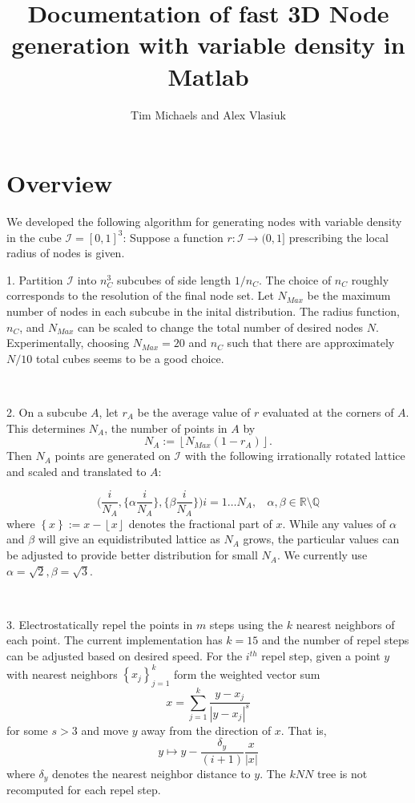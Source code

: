 \documentclass[]{article}
\title{Documentation of fast 3D Node generation with variable density in Matlab}
\author{Tim Michaels and Alex Vlasiuk}
\date{}
\begin{document}
\maketitle

\section{Overview}
We developed the following algorithm for generating nodes with variable density in the cube $\mathcal{I} = [0,1]^3$: Suppose a function $r: \mathcal{I} \to (0,1]$ prescribing the local radius of nodes is given. 

1. Partition $\mathcal{I}$ into $n_C^3$ subcubes of side length $1/n_C$. The choice of $n_C$ roughly corresponds to the resolution of the final node set. Let $N_{Max}$ be the maximum number of nodes in each subcube in the inital distribution. The radius function, $n_C$, and $N_{Max}$ can be scaled to change the total number of desired nodes $N$. Experimentally, choosing $N_{Max} = 20$ and $n_C$ such that there are approximately $N/10$ total cubes seems to be a good choice.

\

2. On a subcube $A$, let $r_A$ be the average value of $r$ evaluated at the corners of $A$. This determines $N_A$, the number of points in $A$ by
\[N_A:= \left\lfloor N_{Max}(1-r_A)\right\rfloor.\]
Then $N_A$ points are generated on $\mathcal{I}$ with the following irrationally rotated lattice and scaled and translated to $A$:

\[\bigg(\frac{i}{N_A}, \bigg\{\alpha\frac{i}{N_A}\bigg\}, \bigg\{\beta\frac{i}{N_A}\bigg\}\bigg)i=1\dots N_A,\ \ \ \  \alpha, \beta\in\mathbb{R}\setminus\mathbb{Q}\]
where $\left\{x\right\}:= x-\left\lfloor x\right\rfloor$ denotes the fractional part of $x$. While any values of $\alpha$ and $\beta$ will give an equidistributed lattice as $N_A$ grows, the particular values can be adjusted to provide better distribution for small $N_A$. We currently use $\alpha = \sqrt{2}, \beta = \sqrt{3}$.

\

3. Electrostatically repel the points in $m$ steps using the $k$ nearest neighbors of each point. The current implementation has $k=15$ and the number of repel steps can be adjusted based on desired speed. For the $i^{th}$ repel step, given a point $y$ with nearest neighbors $\left\{x_j\right\}_{j=1}^k$ form the weighted vector sum
\[x = \sum_{j=1}^{k}\frac{y-x_j}{|y-x_j|^s} \]
for some $s>3$ and move $y$ away from the direction of $x$. That is,
\[y\mapsto y - \frac{\delta_y}{(i+1)}\frac{x}{|x|}\]
where $\delta_y$ denotes the nearest neighbor distance to $y$. The $kNN$ tree is not recomputed for each repel step.
\end{document}
